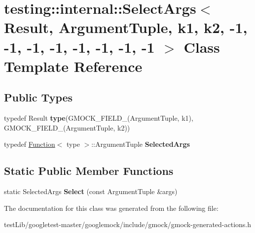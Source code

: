 \hypertarget{classtesting_1_1internal_1_1SelectArgs_3_01Result_00_01ArgumentTuple_00_01k1_00_01k2_00_01-1_00_9a332764141890440172b7f06e77bbee}{}\section{testing\+:\+:internal\+:\+:Select\+Args$<$ Result, Argument\+Tuple, k1, k2, -\/1, -\/1, -\/1, -\/1, -\/1, -\/1, -\/1, -\/1 $>$ Class Template Reference}
\label{classtesting_1_1internal_1_1SelectArgs_3_01Result_00_01ArgumentTuple_00_01k1_00_01k2_00_01-1_00_9a332764141890440172b7f06e77bbee}
\subsection*{Public Types}
\begin{DoxyCompactItemize}
\item 
\mbox{\label{classtesting_1_1internal_1_1SelectArgs_3_01Result_00_01ArgumentTuple_00_01k1_00_01k2_00_01-1_00_9a332764141890440172b7f06e77bbee_a469a6dd6962fc4d816bc1ca254c55d50}} 
typedef Result {\bfseries type}(G\+M\+O\+C\+K\+\_\+\+F\+I\+E\+L\+D\+\_\+(Argument\+Tuple, k1), G\+M\+O\+C\+K\+\_\+\+F\+I\+E\+L\+D\+\_\+(Argument\+Tuple, k2))
\item 
\mbox{\label{classtesting_1_1internal_1_1SelectArgs_3_01Result_00_01ArgumentTuple_00_01k1_00_01k2_00_01-1_00_9a332764141890440172b7f06e77bbee_a38c94bd44f857c5e1d4136f7a283e3e1}} 
typedef \hyperlink{structtesting_1_1internal_1_1Function}{Function}$<$ type $>$\+::Argument\+Tuple {\bfseries Selected\+Args}
\end{DoxyCompactItemize}
\subsection*{Static Public Member Functions}
\begin{DoxyCompactItemize}
\item 
\mbox{\label{classtesting_1_1internal_1_1SelectArgs_3_01Result_00_01ArgumentTuple_00_01k1_00_01k2_00_01-1_00_9a332764141890440172b7f06e77bbee_ab9239ba0c8afd6d36332fe5f65f12e5a}} 
static Selected\+Args {\bfseries Select} (const Argument\+Tuple \&args)
\end{DoxyCompactItemize}


The documentation for this class was generated from the following file\+:\begin{DoxyCompactItemize}
\item 
test\+Lib/googletest-\/master/googlemock/include/gmock/gmock-\/generated-\/actions.\+h\end{DoxyCompactItemize}

